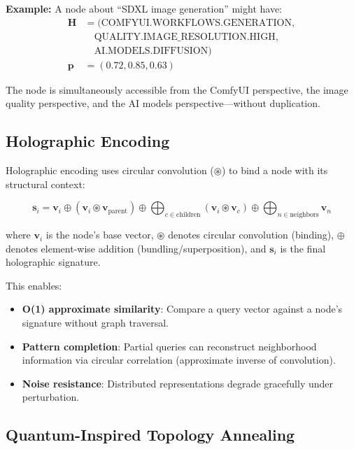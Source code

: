 \documentclass[11pt,a4paper]{article}
\begin{document}
\textbf{Example:} A node about ``SDXL image generation'' might have:
\begin{align*}
    \mathbf{H} &= (\text{COMFYUI.WORKFLOWS.GENERATION},\\
                &\quad \text{QUALITY.IMAGE\_RESOLUTION.HIGH},\\
                &\quad \text{AI.MODELS.DIFFUSION})\\
    \mathbf{p} &= (0.72, 0.85, 0.63)
\end{align*}

The node is simultaneously accessible from the ComfyUI perspective, the image quality perspective, and the AI models perspective---without duplication.

\subsection{Holographic Encoding}

Holographic encoding uses circular convolution ($\circledast$) to bind a node with its structural context:

\begin{equation}
    \mathbf{s}_i = \mathbf{v}_i \oplus (\mathbf{v}_i \circledast \mathbf{v}_{\text{parent}}) \oplus \bigoplus_{c \in \text{children}} (\mathbf{v}_i \circledast \mathbf{v}_c) \oplus \bigoplus_{n \in \text{neighbors}} \mathbf{v}_n
\end{equation}

where $\mathbf{v}_i$ is the node's base vector, $\circledast$ denotes circular convolution (binding), $\oplus$ denotes element-wise addition (bundling/superposition), and $\mathbf{s}_i$ is the final holographic signature.

This enables:
\begin{itemize}[leftmargin=*,itemsep=0pt]
    \item \textbf{O(1) approximate similarity}: Compare a query vector against a node's signature without graph traversal.
    \item \textbf{Pattern completion}: Partial queries can reconstruct neighborhood information via circular correlation (approximate inverse of convolution).
    \item \textbf{Noise resistance}: Distributed representations degrade gracefully under perturbation.
\end{itemize}

\subsection{Quantum-Inspired Topology Annealing}
\end{document}
